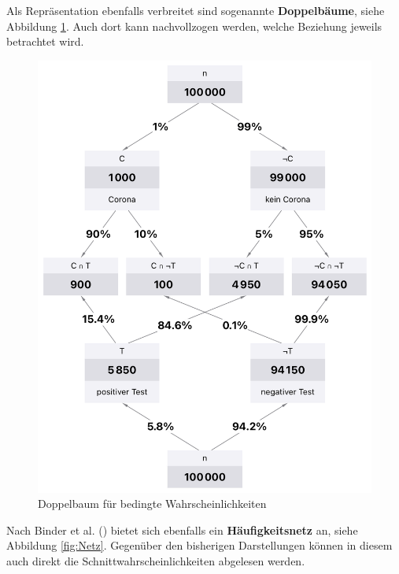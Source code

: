 \documentclass[
]{scrbook}
\theoremstyle{definition}
\theoremstyle{definition}
\theoremstyle{definition}
\theoremstyle{definition}
\theoremstyle{remark}
\begin{document}
Als Repräsentation ebenfalls verbreitet sind sogenannte \textbf{Doppelbäume}, siehe Abbildung \ref{fig:Doppelbaum}. Auch dort kann nachvollzogen werden, welche Beziehung jeweils betrachtet wird.

\begin{figure}

{\centering \includegraphics[width=0.75\linewidth]{pictures/12-Doppelbaum} 

}

\caption{Doppelbaum für bedingte Wahrscheinlichkeiten}\label{fig:Doppelbaum}
\end{figure}

Nach Binder et al. () bietet sich ebenfalls ein \textbf{Häufigkeitsnetz} an, siehe Abbildung \ref{fig:Netz}. Gegenüber den bisherigen Darstellungen können in diesem auch direkt die Schnittwahrscheinlichkeiten abgelesen werden.
\end{document}
